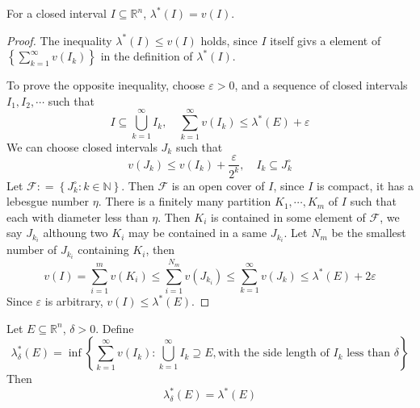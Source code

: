 \documentclass[../main.tex]{subfiles}
\begin{document}
\begin{theorem}{}{}
    For a closed interval \(  I\subseteq \mathbb{R} ^{n}  \), \(   \lambda ^{*}\left( I \right)= v\left( I \right)    \).   
\end{theorem}

\begin{proof}
    The inequality \(   \lambda ^{*}\left( I \right)\le v\left( I \right)    \) holds, since \(  I  \) itself givs a element of \(  \left\{ \sum _{k = 1}^{\infty}v\left( I _{k} \right)  \right\}  \)   in the definition of \(   \lambda ^{*}\left( I \right)   \). 

    To prove the opposite inequality, choose \(   \varepsilon > 0  \), and a sequence of closed intervals \(  I_1,I_2,\cdots   \) such that \[
    I\subseteq \bigcup _{k = 1}^{\infty}I _{k},\quad \sum _{ k= 1}^{\infty}v\left( I _{k} \right) \le  \lambda ^{*}\left( E \right)+  \varepsilon   
    \]  We can choose closed intervals \(  J_{k}  \) such that \[
    v\left( J_{k} \right)\le v\left( I _{k} \right)+ \frac{ \varepsilon  }{2^{k} },\quad  I _{k}\subseteq J_{k}^{\circ}   
    \]Let \(  \mathcal{F}  : =  \left\{ J_{k}^{\circ}:k \in \mathbb{N}  \right\}\).    Then \(  \mathcal{F}  \) is an open cover of \(  I  \), since \(  I  \) is compact, it has a lebesgue number \(  \eta   \).    There is a finitely many partition \(   K_1,\cdots,K_m   \) of \(  I  \) such that each  with diameter less than \(  \eta   \). Then \(  K_{i}  \) is contained in some  element of \(  \mathcal{F}  \), we say \(  J_{k_{i}}  \)    althoung two \(  K_{i}  \) may be contained in a same \(  J_{k_{i}}  \).  Let \(  N_{m}  \) be the smallest number of \(  J_{k_{i}}  \) containing \(  K_{i}  \), then \[
    v\left( I \right)= \sum _{i= 1}^{m}v\left( K_{i} \right)\le \sum _{i = 1}^{N_{m}}v\left( J_{k_{i}} \right)\le \sum _{ k = 1}^{\infty}v\left( J_{k} \right)    \le   \lambda ^{*}\left( E \right)+ 2 \varepsilon  
    \]     Since \(   \varepsilon   \) is arbitrary, \(  v\left( I \right)\le  \lambda ^{*}\left( E \right)    \).   
\end{proof}

\begin{lemma}{}{}
    Let \(  E\subseteq \mathbb{R} ^{n}  \), \(   \delta > 0  \). Define \[
     \lambda _{ \delta }^{*}\left( E \right)= \inf \left\{ \sum _{k= 1}^{\infty}v\left( I_{k} \right):\bigcup _{k= 1}^{\infty}I_{k}\supseteq E, \text{with the side length of } I_{k} \text{ less than } \delta    \right\} 
    \]  Then \[
     \lambda _{ \delta }^{*}\left( E \right)=  \lambda ^{*}\left( E \right)  
    \]
\end{lemma}
\end{document}
